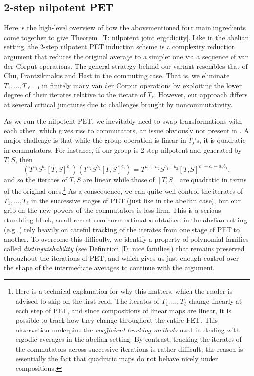\documentclass[11pt]{amsart}
\theoremstyle{definition}
\newcommand{\1}{{\mathbf{1}}}
\begin{document}
\subsection{2-step nilpotent PET}
Here is the high-level overview of how the abovementioned four main ingredients come together to give Theorem~\ref{T: nilpotent joint ergodicity}. Like in the abelian setting, the 2-step nilpotent PET induction scheme is a complexity reduction argument that reduces the original average to a simpler one via a sequence of van der Corput operations. The general strategy behind our variant resembles that of Chu, Frantzikinakis and Host \cite{CFH11} in the commuting case. That is, we eliminate  $T_1, \ldots, T_{\ell-1}$ in finitely many van der Corput operations by exploiting the lower degree of their iterates relative to the iterate of $T_\ell$. However, our approach differs at several critical junctures due to challenges brought by noncommutativity. 


As we run the nilpotent PET, we inevitably need to swap transformations with each other, which gives rise to commutators, an issue obviously not present in \cite{CFH11}. A major challenge is that while the group operation is linear in $T_j$'s, it is quadratic in commutators. For instance, if our group is 2-step nilpotent and generated by $T, S$, then 
$$(T^{a_1}S^{b_1}[T,S]^{c_1})(T^{a_2}S^{b_2}[T,S]^{c_2}) = T^{a_1 + a_2}S^{b_1 + b_2}[T,S]^{c_1 + c_2 - a_2 b_1},$$
and so the iterates of $T, S$ are linear while those of $[T, S]$ are quadratic in terms of the original ones.\footnote{Here is a technical explanation for why this matters, which the reader is advised to skip on the first read. The iterates of $T_1, \ldots, T_\ell$ change linearly at each step of PET, and since compositions of linear maps are linear, it is possible to track how they change throughout the entire PET. This observation underpins the \textit{coefficient tracking methods} used in dealing with ergodic averages in the abelian setting. By contrast, tracking the iterates of the commutators across successive iterations is rather difficult; the reason is essentially the fact that quadratic maps do not behave nicely under compositions.} 
As a consequence, we can quite well control the iterates of $T_1, \ldots, T_\ell$ in the successive stages of PET (just like in the abelian case), but our grip on the new powers of the commutators is less firm. This is a serious stumbling block, as all recent seminorm estimates obtained in the abelian setting (e.g. \cite{DFKS22, DKKST24, KKL24a, Kuc23}) rely heavily on careful tracking of the iterates from one stage of PET to another.  To overcome this difficulty, we identify  a property of polynomial families called \textit{distinguishability} (see Definition \ref{D: nice families}) that remains preserved throughout the iterations of PET, and which
gives us just enough control over the shape of the intermediate averages to continue with the argument.
\end{document}
